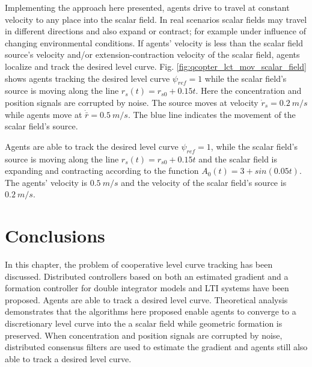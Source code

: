 Implementing the approach here presented,  agents drive to travel at constant velocity to any place into the scalar field. In real scenarios scalar fields may travel in different directions and also expand or contract; for example under influence of changing environmental conditions. If agents' velocity is less than the scalar field source's velocity and/or extension-contraction velocity of the scalar field, agents localize and track the desired level curve.  Fig. \ref{fig:qcopter_lct_mov_scalar_field} shows agents tracking the desired level curve $\psi_{ref}=1$ while the scalar field's source is moving along the line $r_s(t)= r_{s0}+0.15t$.  Here the concentration and position signals are corrupted by noise.  The source moves at velocity $\dot{r}_s=0.2 \ m/s$ while agents move at $\dot{\bar{r}}=0.5 \ m/s$. The blue line indicates the movement of the scalar field's source.


Agents are able to track the desired level curve $\psi_{ref}=1$, while the scalar field's source is moving along the line $r_s(t)= r_{s0}+0.15t$ and the scalar field is expanding and contracting according to the function $A_0(t)=3 +sin(0.05t)$. The agents' velocity is $0.5 \ m/s$ and the velocity of the scalar field's source is $0.2 \ m/s$.



\section{Conclusions} \label{sec:lc_concl}
In this chapter, the problem of cooperative level curve tracking has been discussed. Distributed controllers based on both an estimated gradient and a formation controller for double integrator models and LTI systems have been proposed. Agents are able to track a desired level curve. Theoretical analysis demonstrates that the algorithms here proposed enable agents  to converge to a discretionary level curve into the a scalar field while  geometric formation is preserved. When  concentration and position signals are corrupted by noise, distributed consensus filters are used to estimate the gradient and agents still also able to track a desired level curve.




